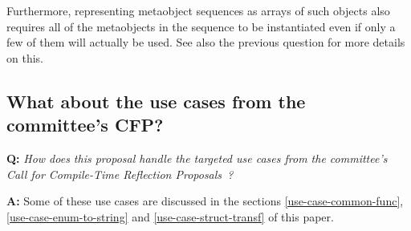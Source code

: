 Furthermore, representing metaobject sequences as arrays of such \verb@constexpr@
objects also requires all of the metaobjects in the sequence to be instantiated
even if only a few of them will actually be used. See also the previous
question for more details on this.

\subsection{What about the use cases from the committee's CFP?}

\textbf{Q:} {\em How does this proposal handle the targeted use cases
from the committee's Call for Compile-Time Reflection
Proposals~\cite{ISOCPP-N3814}?}

\textbf{A:} Some of these use cases are discussed in the sections
\ref{use-case-common-func}, \ref{use-case-enum-to-string}
and \ref{use-case-struct-transf} of this paper.

